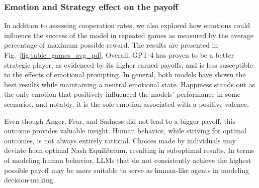 \documentclass{article}
\begin{document}
 

\subsubsection{Emotion and Strategy effect on the payoff} 
In addition to assessing cooperation rates, we also explored how emotions could influence the success of the model in repeated games as measured by the average percentage of maximum possible reward. The results are presented in Fig.~\ref{fig:table_games_avg_pd}. Overall, GPT-4 has proven to be a better strategic player, as evidenced by its higher earned payoffs, and is less susceptible to the effects of emotional prompting. In general, both models have shown the best results while maintaining a neutral emotional state. Happiness stands out as the only emotion that positively influenced the models' performance in some scenarios, and notably, it is the sole emotion associated with a positive valence. %

Even though Anger, Fear, and Sadness did not lead to a bigger payoff, this outcome provides valuable insight. Human behavior, while striving for optimal outcomes, is not always entirely rational. Choices made by individuals may deviate from optimal Nash Equilibrium, resulting in suboptimal results. In terms of modeling human behavior, LLMs that do not consistently achieve the highest possible payoff may be more suitable to serve as human-like agents in modeling decision-making. 





\end{document}

